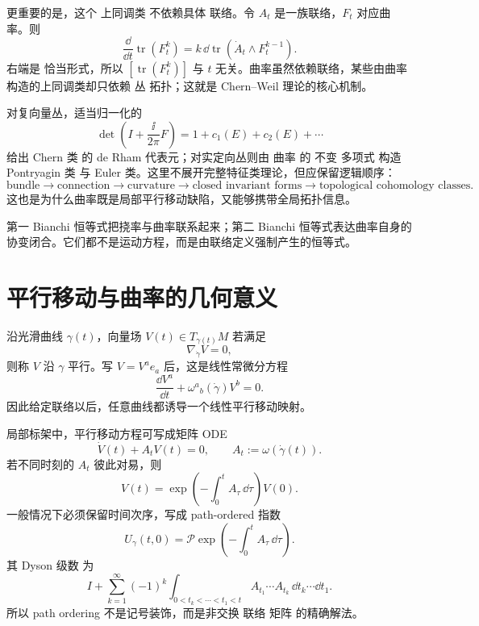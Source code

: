 更重要的是，这个 上同调类 不依赖具体 联络。令 $A_t$ 是一族联络，$F_t$ 对应曲率。则
\begin{equation}
\frac{\dd}{\dd t}\operatorname{tr}(F_t^k)
=k\,\dd\operatorname{tr}
\left(\dot A_t\wedge F_t^{k-1}\right).
\label{eq:chern-weil-transgression}
\end{equation}
右端是 恰当形式，所以 $[\operatorname{tr}(F_t^k)]$ 与 $t$ 无关。曲率虽然依赖联络，某些由曲率构造的上同调类却只依赖 丛 拓扑；这就是 Chern--Weil 理论的核心机制。

对复向量丛，适当归一化的
\[
\det\left(I+\frac{\ii}{2\pi}F\right)
=1+c_1(E)+c_2(E)+\cdots
\]
给出 Chern 类 的 de Rham 代表元；对实定向丛则由 曲率 的 不变 多项式 构造 Pontryagin 类 与 Euler 类。这里不展开完整特征类理论，但应保留逻辑顺序：
\[
\text{bundle}
\to\text{connection}
\to\text{curvature}
\to\text{closed invariant forms}
\to\text{topological cohomology classes}.
\]
这也是为什么曲率既是局部平行移动缺陷，又能够携带全局拓扑信息。

第一 Bianchi 恒等式把挠率与曲率联系起来；第二 Bianchi 恒等式表达曲率自身的协变闭合。它们都不是运动方程，而是由联络定义强制产生的恒等式。




\section{平行移动与曲率的几何意义}
沿光滑曲线 $\gamma(t)$，向量场 $V(t)\in T_{\gamma(t)}M$ 若满足
\begin{equation*}\nabla_{\dot\gamma}V=0,
\end{equation*}
则称 $V$ 沿 $\gamma$ 平行。写 $V=V^ae_a$ 后，这是线性常微分方程
\[
\frac{\dd V^a}{\dd t}
+\omega^a{}_b(\dot\gamma)V^b=0.
\]
因此给定联络以后，任意曲线都诱导一个线性平行移动映射。

局部标架中，平行移动方程可写成矩阵 ODE
\begin{equation}
\dot V(t)+A_tV(t)=0,
\qquad
A_t:=\omega(\dot\gamma(t)).
\label{eq:parallel-matrix-ode}
\end{equation}
若不同时刻的 $A_t$ 彼此对易，则
\[
V(t)=\exp\left(-\int_0^tA_\tau\,\dd\tau\right)V(0).
\]
一般情况下必须保留时间次序，写成 path-ordered 指数
\begin{equation*}U_\gamma(t,0)
=\mathcal P\exp\left(-\int_0^tA_\tau\,\dd\tau\right).\end{equation*}
其 Dyson 级数 为
\[
I+
\sum_{k=1}^\infty(-1)^k
\int_{0<t_k<\cdots<t_1<t}
A_{t_1}\cdots A_{t_k}
\,\dd t_k\cdots\dd t_1.
\]
所以 path ordering 不是记号装饰，而是非交换 联络 矩阵 的精确解法。

